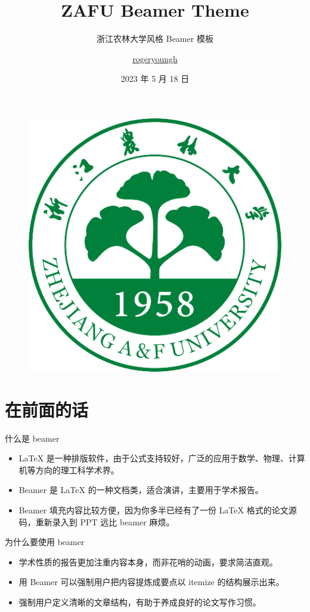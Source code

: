 \documentclass{ctexbeamer}
\author{\href{https://rogery.dev/}{rogeryoungh}}
\title{ZAFU Beamer Theme}
\subtitle{浙江农林大学风格 Beamer 模板}
\institute{浙江农林大学 数学与计算机学院}
\date{2023 年 5 月 18 日}
\begin{document}
\rmfamily
\begin{frame}
	\titlepage
	\begin{figure}[htpb]
		\begin{center}
			\includegraphics[width=0.175\linewidth]{pic/zafu-logo.png}
		\end{center}
	\end{figure}
\end{frame}

\begin{frame}
	\tableofcontents[sectionstyle=show,subsectionstyle=show/shaded/hide,subsubsectionstyle=show/shaded/hide]
\end{frame}


\section{在前面的话}

\begin{frame}{什么是 beamer}
	\begin{itemize}
		\item \LaTeX{} 是一种排版软件，由于公式支持较好，广泛的应用于数学、物理、计算机等方向的理工科学术界。
		\item Beamer 是 \LaTeX{} 的一种文档类，适合演讲，主要用于学术报告。
		\item Beamer 填充内容比较方便，因为你多半已经有了一份 \LaTeX{} 格式的论文源码，重新录入到 PPT 远比 beamer 麻烦。
	\end{itemize}
\end{frame}

\begin{frame}{为什么要使用 beamer}
	\begin{itemize}
		\item 学术性质的报告更加注重内容本身，而非花哨的动画，要求简洁直观。
		\item 用 Beamer 可以强制用户把内容提炼成要点以 itemize 的结构展示出来。
		\item 强制用户定义清晰的文章结构，有助于养成良好的论文写作习惯。
	\end{itemize}
\end{frame}
\end{document}
